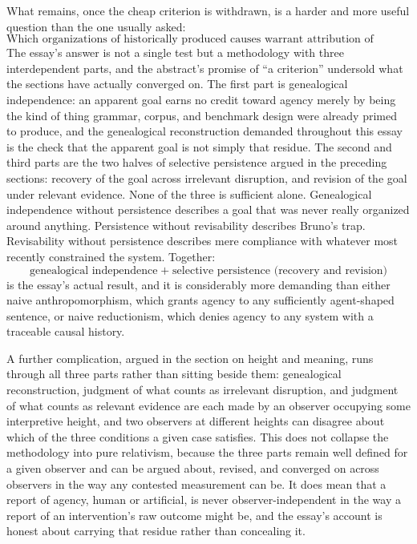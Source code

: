 \documentclass[11pt]{article}
\begin{document}
What remains, once the cheap criterion is withdrawn, is a harder and more useful question than the one usually asked:
\[
\boxed{\text{Which organizations of historically produced causes warrant attribution of agency?}}
\]
The essay's answer is not a single test but a methodology with three interdependent parts, and the abstract's promise of ``a criterion'' undersold what the sections have actually converged on. The first part is genealogical independence: an apparent goal earns no credit toward agency merely by being the kind of thing grammar, corpus, and benchmark design were already primed to produce, and the genealogical reconstruction demanded throughout this essay is the check that the apparent goal is not simply that residue. The second and third parts are the two halves of selective persistence argued in the preceding sections: recovery of the goal across irrelevant disruption, and revision of the goal under relevant evidence. None of the three is sufficient alone. Genealogical independence without persistence describes a goal that was never really organized around anything. Persistence without revisability describes Bruno's trap. Revisability without persistence describes mere compliance with whatever most recently constrained the system. Together:
\[
\boxed{\text{genealogical independence} \;+\; \text{selective persistence (recovery and revision)}}
\]
is the essay's actual result, and it is considerably more demanding than either naive anthropomorphism, which grants agency to any sufficiently agent-shaped sentence, or naive reductionism, which denies agency to any system with a traceable causal history.

A further complication, argued in the section on height and meaning, runs through all three parts rather than sitting beside them: genealogical reconstruction, judgment of what counts as irrelevant disruption, and judgment of what counts as relevant evidence are each made by an observer occupying some interpretive height, and two observers at different heights can disagree about which of the three conditions a given case satisfies. This does not collapse the methodology into pure relativism, because the three parts remain well defined for a given observer and can be argued about, revised, and converged on across observers in the way any contested measurement can be. It does mean that a report of agency, human or artificial, is never observer-independent in the way a report of an intervention's raw outcome might be, and the essay's account is honest about carrying that residue rather than concealing it.
\end{document}

